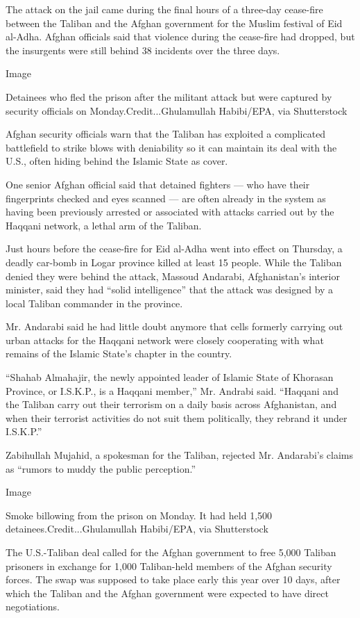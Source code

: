 The attack on the jail came during the final hours of a three-day
cease-fire between the Taliban and the Afghan government for the Muslim
festival of Eid al-Adha. Afghan officials said that violence during the
cease-fire had dropped, but the insurgents were still behind 38
incidents over the three days.

Image

Detainees who fled the prison after the militant attack but were
captured by security officials on Monday.Credit...Ghulamullah
Habibi/EPA, via Shutterstock

Afghan security officials warn that the Taliban has exploited a
complicated battlefield to strike blows with deniability so it can
maintain its deal with the U.S., often hiding behind the Islamic State
as cover.

One senior Afghan official said that detained fighters --- who have
their fingerprints checked and eyes scanned --- are often already in the
system as having been previously arrested or associated with attacks
carried out by the Haqqani network, a lethal arm of the Taliban.

Just hours before the cease-fire for Eid al-Adha went into effect on
Thursday, a deadly car-bomb in Logar province killed at least 15 people.
While the Taliban denied they were behind the attack, Massoud Andarabi,
Afghanistan's interior minister, said they had ``solid intelligence''
that the attack was designed by a local Taliban commander in the
province.

Mr. Andarabi said he had little doubt anymore that cells formerly
carrying out urban attacks for the Haqqani network were closely
cooperating with what remains of the Islamic State's chapter in the
country.

``Shahab Almahajir, the newly appointed leader of Islamic State of
Khorasan Province, or I.S.K.P., is a Haqqani member,'' Mr. Andrabi said.
``Haqqani and the Taliban carry out their terrorism on a daily basis
across Afghanistan, and when their terrorist activities do not suit them
politically, they rebrand it under I.S.K.P.''

Zabihullah Mujahid, a spokesman for the Taliban, rejected Mr. Andarabi's
claims as ``rumors to muddy the public perception.''

Image

Smoke billowing from the prison on Monday. It had held 1,500
detainees.Credit...Ghulamullah Habibi/EPA, via Shutterstock

The U.S.-Taliban deal called for the Afghan government to free 5,000
Taliban prisoners in exchange for 1,000 Taliban-held members of the
Afghan security forces. The swap was supposed to take place early this
year over 10 days, after which the Taliban and the Afghan government
were expected to have direct negotiations.

